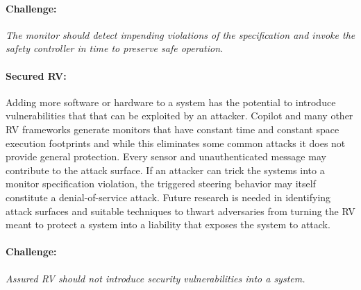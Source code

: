 \paragraph{Challenge:} \emph{The monitor should detect impending violations of
  the specification and invoke the safety controller in time to
  preserve safe operation.}


\paragraph{Secured RV:} Adding more software or hardware to a system
has the potential to introduce vulnerabilities that that can be
exploited by an attacker.  Copilot and many other RV frameworks
generate monitors that have constant time and constant space execution
footprints and while this eliminates some common attacks it does not
provide general protection. Every sensor and unauthenticated message
may contribute to the attack surface. If an attacker can trick the
systems into a monitor specification violation, the triggered steering
behavior may itself constitute a denial-of-service attack.  Future
research is needed in identifying attack surfaces and suitable
techniques to thwart adversaries from turning the RV meant to protect
a system into a liability that exposes the system to attack.

\paragraph{Challenge:} \emph{Assured RV should not introduce security
vulnerabilities into a system.} 



